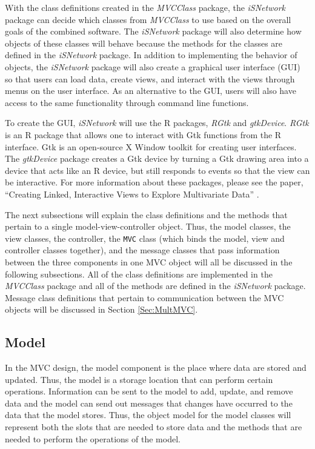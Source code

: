 \documentclass{article}[11pt]
\newcommand{\Robject}[1]{{\texttt{#1}}}
\newcommand{\Rpackage}[1]{{\textit{#1}}}
\begin{document}
With the class definitions created in the \Rpackage{MVCClass} package, the
\Rpackage{iSNetwork} package can decide which classes from \Rpackage{MVCClass}
to use based on the overall goals of the combined software.  The
\Rpackage{iSNetwork} package will also determine how objects of these classes
will behave because the methods for the classes are defined in the
\Rpackage{iSNetwork} package.  In addition to implementing the behavior of
objects, the \Rpackage{iSNetwork} package will also create a graphical user
interface (GUI) so that users can load data, create views, and interact with
the views through menus on the user interface.  As an alternative to the GUI,
users will also have access to the same functionality through command line
functions.  

To create the GUI, \Rpackage{iSNetwork} will use the R packages,
\Rpackage{RGtk} and \Rpackage{gtkDevice}.  \Rpackage{RGtk} is an R package
that allows one to interact with Gtk functions from the R interface.  Gtk is
an open-source X Window toolkit \cite{Gtk} for creating user interfaces.  The
\Rpackage{gtkDevice} package creates a Gtk device by turning a Gtk drawing
area into a device that acts like an R device, but still responds to events so
that the view can be interactive.  For more information about these packages,
please see the paper, ``Creating Linked, Interactive Views to Explore
Multivariate Data'' \cite{EW05}.  

The next subsections will explain the class definitions and the methods that
pertain to a single model-view-controller object.  Thus, the model classes,
the view classes, the controller, the \Robject{MVC} class (which binds the
model, view and controller classes together), and the message classes that
pass information between the three components in one MVC object will all be
discussed in the following subsections.  All of the class definitions are
implemented in the \Rpackage{MVCClass} package and all of the methods are
defined in the \Rpackage{iSNetwork} package.  Message class definitions that
pertain to communication between the MVC objects will be discussed in Section
\ref{Sec:MultMVC}. 

\subsection{Model}\label{Ssec:OneModel}

In the MVC design, the model component is the place where data are stored and
updated.  Thus, the model is a storage location that can perform certain
operations.  Information can be sent to the model to add, update, and remove
data and the model can send out messages that changes have occurred to the
data that the model stores.  Thus, the object model for the model classes will
represent both the slots that are needed to store data and the methods that
are needed to perform the operations of the model. 
\end{document}
